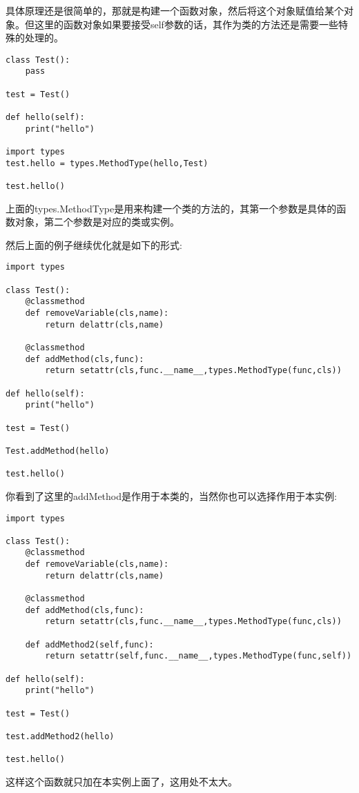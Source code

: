 \documentclass[12pt,oneside]{book}
\begin{document}
\begin{common-format}
具体原理还是很简单的，那就是构建一个函数对象，然后将这个对象赋值给某个对象。但这里的函数对象如果要接受self参数的话，其作为类的方法还是需要一些特殊的处理的。

\begin{Verbatim}
class Test():
    pass

test = Test()

def hello(self):
    print("hello")

import types
test.hello = types.MethodType(hello,Test)

test.hello()
\end{Verbatim}

上面的types.MethodType是用来构建一个类的方法的，其第一个参数是具体的函数对象，第二个参数是对应的类或实例。

然后上面的例子继续优化就是如下的形式:
\begin{Verbatim}
import types

class Test():
    @classmethod
    def removeVariable(cls,name):
        return delattr(cls,name)

    @classmethod
    def addMethod(cls,func):
        return setattr(cls,func.__name__,types.MethodType(func,cls))

def hello(self):
    print("hello")

test = Test()

Test.addMethod(hello)

test.hello()
\end{Verbatim}

你看到了这里的addMethod是作用于本类的，当然你也可以选择作用于本实例:

\begin{Verbatim}
import types

class Test():
    @classmethod
    def removeVariable(cls,name):
        return delattr(cls,name)

    @classmethod
    def addMethod(cls,func):
        return setattr(cls,func.__name__,types.MethodType(func,cls))

    def addMethod2(self,func):
        return setattr(self,func.__name__,types.MethodType(func,self))

def hello(self):
    print("hello")

test = Test()

test.addMethod2(hello)

test.hello()
\end{Verbatim}

这样这个函数就只加在本实例上面了，这用处不太大。



\end{common-format}
\end{document}
